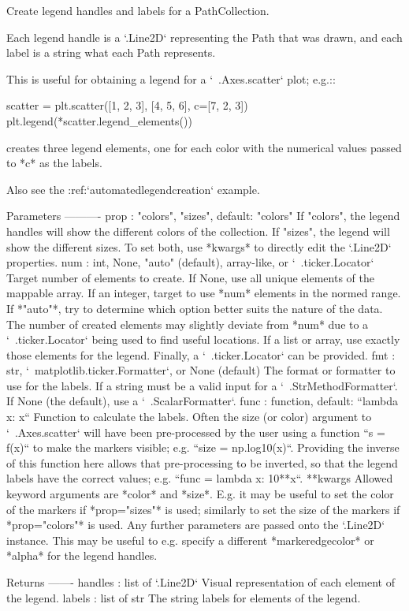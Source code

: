 \begin{DoxyVerb}Create legend handles and labels for a PathCollection.

Each legend handle is a `.Line2D` representing the Path that was drawn,
and each label is a string what each Path represents.

This is useful for obtaining a legend for a `~.Axes.scatter` plot;
e.g.::

    scatter = plt.scatter([1, 2, 3],  [4, 5, 6],  c=[7, 2, 3])
    plt.legend(*scatter.legend_elements())

creates three legend elements, one for each color with the numerical
values passed to *c* as the labels.

Also see the :ref:`automatedlegendcreation` example.

Parameters
----------
prop : {"colors", "sizes"}, default: "colors"
    If "colors", the legend handles will show the different colors of
    the collection. If "sizes", the legend will show the different
    sizes. To set both, use *kwargs* to directly edit the `.Line2D`
    properties.
num : int, None, "auto" (default), array-like, or `~.ticker.Locator`
    Target number of elements to create.
    If None, use all unique elements of the mappable array. If an
    integer, target to use *num* elements in the normed range.
    If *"auto"*, try to determine which option better suits the nature
    of the data.
    The number of created elements may slightly deviate from *num* due
    to a `~.ticker.Locator` being used to find useful locations.
    If a list or array, use exactly those elements for the legend.
    Finally, a `~.ticker.Locator` can be provided.
fmt : str, `~matplotlib.ticker.Formatter`, or None (default)
    The format or formatter to use for the labels. If a string must be
    a valid input for a `~.StrMethodFormatter`. If None (the default),
    use a `~.ScalarFormatter`.
func : function, default: ``lambda x: x``
    Function to calculate the labels.  Often the size (or color)
    argument to `~.Axes.scatter` will have been pre-processed by the
    user using a function ``s = f(x)`` to make the markers visible;
    e.g. ``size = np.log10(x)``.  Providing the inverse of this
    function here allows that pre-processing to be inverted, so that
    the legend labels have the correct values; e.g. ``func = lambda
    x: 10**x``.
**kwargs
    Allowed keyword arguments are *color* and *size*. E.g. it may be
    useful to set the color of the markers if *prop="sizes"* is used;
    similarly to set the size of the markers if *prop="colors"* is
    used. Any further parameters are passed onto the `.Line2D`
    instance. This may be useful to e.g. specify a different
    *markeredgecolor* or *alpha* for the legend handles.

Returns
-------
handles : list of `.Line2D`
    Visual representation of each element of the legend.
labels : list of str
    The string labels for elements of the legend.
\end{DoxyVerb}
